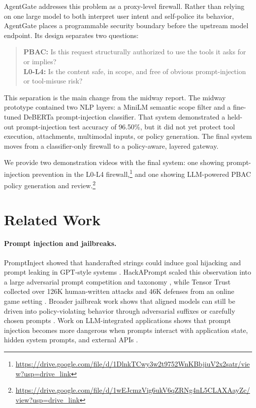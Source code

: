 \documentclass[11pt]{article}
\begin{document}
AgentGate addresses this problem as a proxy-level firewall. Rather than relying on one large model to both interpret user intent and self-police its behavior, AgentGate places a programmable security boundary before the upstream model endpoint. Its design separates two questions:

\begin{quote}
\small
\textbf{PBAC:} Is this request structurally authorized to use the tools it asks for or implies?\\
\textbf{L0-L4:} Is the content safe, in scope, and free of obvious prompt-injection or tool-misuse risk?
\end{quote}

This separation is the main change from the midway report. The midway prototype contained two NLP layers: a MiniLM semantic scope filter and a fine-tuned DeBERTa prompt-injection classifier. That system demonstrated a held-out prompt-injection test accuracy of 96.50\%, but it did not yet protect tool execution, attachments, multimodal inputs, or policy generation. The final system moves from a classifier-only firewall to a policy-aware, layered gateway.

We provide two demonstration videos with the final system: one showing prompt-injection prevention in the L0-L4 firewall,\footnote{\url{https://drive.google.com/file/d/1DlnkTCwy3w2t9752WnKBbjiuV2x2satr/view?usp=drive_link}} and one showing LLM-powered PBAC policy generation and review.\footnote{\url{https://drive.google.com/file/d/1wEJcmzVig6ukV6qZRNg4nL5CLAXAayZc/view?usp=drive_link}}

\section{Related Work}

\paragraph{Prompt injection and jailbreaks.}
PromptInject showed that handcrafted strings could induce goal hijacking and prompt leaking in GPT-style systems \citep{perez2022ignore}. HackAPrompt scaled this observation into a large adversarial prompt competition and taxonomy \citep{schulhoff2023hackaprompt}, while Tensor Trust collected over 126K human-written attacks and 46K defenses from an online game setting \citep{toyer2023tensortrust}. Broader jailbreak work shows that aligned models can still be driven into policy-violating behavior through adversarial suffixes or carefully chosen prompts \citep{wei2023jailbroken,zou2023universal}. Work on LLM-integrated applications shows that prompt injection becomes more dangerous when prompts interact with application state, hidden system prompts, and external APIs \citep{liu2023promptinjection}.
\end{document}

